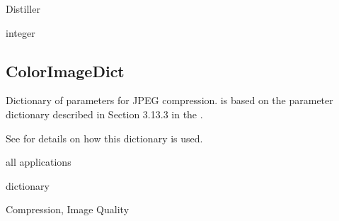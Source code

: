 \documentclass[letterpaper,12pt,english,openany,oneside]{sphinxmanual}
\begin{document}
Distiller

\label{\detokenize{PDF_Create_CommonSettings:type-21}}

integer

\label{\detokenize{PDF_Create_CommonSettings:default-value-18}}

\begin{sphinxVerbatim}[commandchars=\\\{\}]
\end{sphinxVerbatim}




\subsection{ColorImageDict}
\label{\detokenize{PDF_Create_CommonSettings:colorimagedict}}
Dictionary of parameters for JPEG compression.  is based on the  parameter dictionary described in Section 3.13.3 in the  .

See  for details on how this dictionary is used.

\label{\detokenize{PDF_Create_CommonSettings:supported-by-22}}

all applications

\label{\detokenize{PDF_Create_CommonSettings:type-22}}

dictionary

\label{\detokenize{PDF_Create_CommonSettings:ui-name-16}}

Compression, Image Quality

\label{\detokenize{PDF_Create_CommonSettings:default-value-19}}

\begin{sphinxVerbatim}[commandchars=\\\{\}]
   \PYG{p}{[}   \PYG{p}{]}  \PYG{p}{[}   \PYG{p}{]}
\end{sphinxVerbatim}
\end{document}
